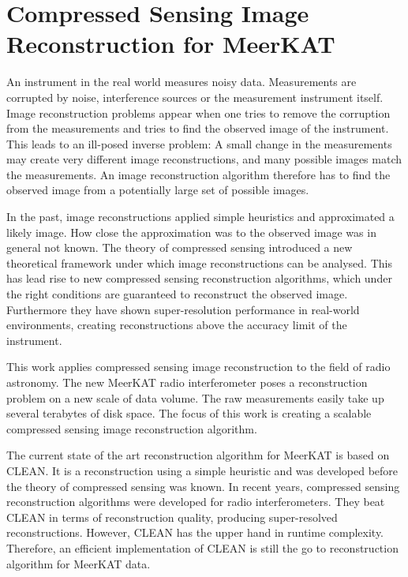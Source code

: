 \section{Compressed Sensing Image Reconstruction for MeerKAT} \label{intro}
An instrument in the real world measures noisy data. Measurements are corrupted by noise, interference sources or the measurement instrument itself. Image reconstruction problems appear when one tries to remove the corruption from the measurements and tries to find the observed image of the instrument. This leads to an ill-posed inverse problem: A small change in the measurements may create very different image reconstructions, and many possible images match the measurements. An image reconstruction algorithm therefore has to find the observed image from a potentially large set of possible images.

In the past, image reconstructions applied simple heuristics and approximated a likely image. How close the approximation was to the observed image was in general not known. The theory of compressed sensing\cite{candes2006robust}\cite{donoho2006compressed} introduced a new theoretical framework under which image reconstructions can be analysed. This has lead rise to new compressed sensing reconstruction algorithms, which under the right conditions are guaranteed to reconstruct the observed image. Furthermore they have shown super-resolution performance in real-world environments, creating reconstructions above the accuracy limit of the instrument.

This work applies compressed sensing image reconstruction to the field of radio astronomy. The new MeerKAT radio interferometer poses a reconstruction problem on a new scale of data volume. The raw measurements easily take up several terabytes of disk space. The focus of this work is creating a scalable compressed sensing image reconstruction algorithm.

The current state of the art reconstruction algorithm for MeerKAT is based on CLEAN\cite{rich2008multi}\cite{rau2011multi}. It is a reconstruction using a simple heuristic and was developed before the theory of compressed sensing was known. In recent years, compressed sensing reconstruction algorithms were developed for radio interferometers\cite{girard2015sparse}\cite{dabbech2018cygnus}\cite{birdi2018sparse}. They beat CLEAN in terms of reconstruction quality, producing super-resolved reconstructions. However, CLEAN has the upper hand in runtime complexity. Therefore, an efficient implementation of CLEAN is still the go to reconstruction algorithm for MeerKAT data.

